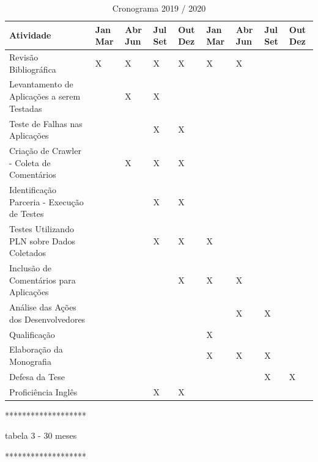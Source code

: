 \begin{table}[htbp]
	\centering
	\caption{Cronograma 2019 / 2020}
	\label{tab:Cronograma}
	\begin{tabular}{p{3.40in} p{0.20in} p{0.20in} p{0.20in} p{0.20in} p{0.20in} p{0.20in} p{0.20in} p{0.20in}} \hline
		\textbf{Atividade}							& Jan Mar & Abr Jun & Jul Set & Out Dez & Jan Mar & Abr Jun & Jul Set & Out Dez \\ \hline
		Revisão Bibliográfica						& X		  & X 	 	& X		  & X  		& X  	  & X  		&         & 	    \\ 
		Levantamento de Aplicações a serem Testadas	& 		  & X	    & X		  &    		&  		  &  	    & 		  & 	    \\ 
		Teste de Falhas nas Aplicações	  			&  		  & 	    & X		  & X		&    	  &  	    &  	      & 		\\ 
		Criação de Crawler - Coleta de Comentários	&  		  & X       & X		  & X		&    	  &  	    &  	      & 		\\ 
		Identificação Parceria - Execução de Testes	&  		  & 	    & X		  & X		&    	  &  	    &  	      & 		\\ 
		Testes Utilizando PLN sobre Dados Coletados &  		  & 	    & X		  & X		& X  	  &  	    &  	      & 		\\
		Inclusão de Comentários para Aplicações		&  		  & 	    &  		  & X		& X  	  & X	    &  	      & 		\\
		Análise das Ações dos Desenvolvedores		&  		  & 	    &  		  &  		&    	  & X	    & X	      & 		\\ \hline
		Qualificação								&  		  & 	    &  		  &  		& X  	  &  	    &  	      & 		\\
		Elaboração da Monografia					&  		  & 	    &  		  &  		& X  	  & X	    & X	      & 		\\
		Defesa da Tese								&  		  & 	    &  		  &  		&    	  &  	    & X	      & X   	\\ \hline
		Proficiência Inglês							&  		  & 	    & X		  & X		&    	  &  	    &  	      & 		\\
	\end{tabular}
\end{table}


*******************

tabela 3 - 30 meses

*******************



